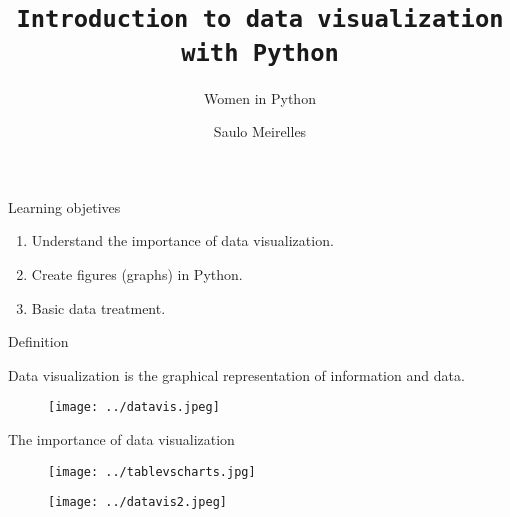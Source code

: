 \documentclass{beamer}
\title{\texttt{Introduction to \textbf{data visualization} with Python}}
\subtitle{Women in Python}
\author{Saulo Meirelles} %
\begin{document}
\begin{frame}
  \maketitle
\end{frame}

\begin{frame}{Learning objetives}

    \begin{enumerate}
    \item Understand the importance of data visualization.\pause
    \item Create figures (graphs) in Python.\pause
    \item Basic data treatment.\pause
    \end{enumerate}

\end{frame}

\begin{frame}{Definition}

\centering  
  Data visualization is the graphical representation of information and data. 

  \begin{figure}
  \texttt{[image: ../datavis.jpeg]}
  \end{figure}
  
\end{frame}


\begin{frame}{The importance of data visualization}

  \begin{figure}
  \texttt{[image: ../tablevscharts.jpg]}
  \end{figure}
  \begin{figure}
  \texttt{[image: ../datavis2.jpeg]}
  \end{figure}

\end{frame}
\end{document}
